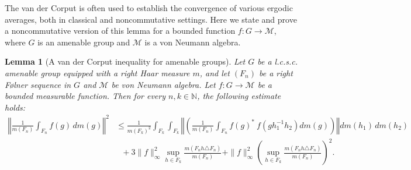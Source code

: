 \documentclass[11pt]{amsart}
\newtheorem{lem}[thm]{Lemma}
\theoremstyle{definition}
\theoremstyle{myremark}
\numberwithin{equation}{section}
\newcommand{\CM}{\mathcal{M}}
\newcommand{\norm}[1]{\left\Vert#1\right\Vert}
\begin{document}
\medskip
\noindent
The van der Corput is often used to establish the convergence of various ergodic averages, both in classical and noncommutative settings. 
Here we state and prove a  noncommutative version of this lemma for a bounded function $f:G \rightarrow \CM$, where $G$ is an amenable group and $\CM$ is a von Neumann algebra.
\begin{lem}[A van der Corput inequality for amenable groups]\label{Lemma_vand}
Let $G$ be a l.c.s.c. amenable group equipped with a right Haar measure $m$, and let $(F_n)$ be a right F\o lner sequence in $G$ and $\CM$ be von Neumann algebra. Let $f : G \to \CM$ be a bounded measurable function. Then for every $n, k \in \mathbb{N}$, the following estimate holds:
\begin{align}\label{Vand_inequality}
\norm{
\frac{1}{m(F_n)} \int_{F_n} f(g)\, dm(g)
}^2 &\leq 
\frac{1}{m(F_k)^2} \int_{F_k} \int_{F_k}
\norm{ \left( \frac{1}{m(F_n)} \int_{F_n}
f( g)^* ~ f( gh_{1}^{-1}h_2) dm(g) \right) }
dm(h_1)\, dm(h_2) \\
&~~~+ 3\|f\|_\infty^2 \sup_{h \in F_k}
\frac{m(F_nh \triangle F_n)}{m(F_n)}  +   \|f\|^2_\infty \left( \sup_{h \in F_k}
\frac{m(F_nh \triangle F_n)}{m(F_n)} \right)^2.
\end{align}

\end{lem}
\end{document}
